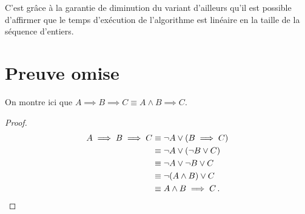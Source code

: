 \documentclass{elsarticle}
\begin{document}
C'est grâce à la garantie de diminution du variant d'ailleurs qu'il est possible d'affirmer que le temps d'exécution de l'algorithme est linéaire en la taille de la séquence d'entiers.

\appendix
\section{Preuve omise}
\label{ann:om}
On montre ici que $A \implies B \implies C \equiv A \land B \implies C$.
\begin{proof}
\begin{align*}
A \implies B \implies C &\equiv \lnot A \lor (B \implies C) \\
&\equiv \lnot A \lor (\lnot B \lor C) \\
&\equiv \lnot A \lor \lnot B \lor C \\
&\equiv \lnot(A \land B) \lor C \\
&\equiv A \land B \implies C\,.\qedhere
\end{align*}
\end{proof}
\end{document}
